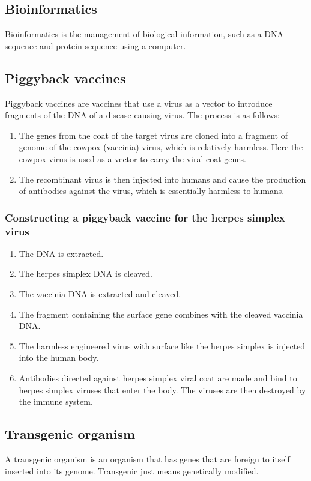 \documentclass[11pt]{article}
\begin{document}
\subsection{Bioinformatics}
\label{sec:orgea7b9d4}
Bioinformatics is the management of biological information, such as a DNA sequence and protein sequence using a computer.
\subsection{Piggyback vaccines}
\label{sec:orga0442e5}
Piggyback vaccines are vaccines that use a virus as a vector to introduce fragments of the DNA of a disease-causing virus. The process is as follows:
\begin{enumerate}
\item The genes from the coat of the target virus are cloned into a fragment of genome of the cowpox (vaccinia) virus, which is relatively harmless. Here the cowpox virus is used as a vector to carry the viral coat genes.
\item The recombinant virus is then injected into humans and cause the production of antibodies against the virus, which is essentially harmless to humans.
\end{enumerate}
\subsubsection{Constructing a piggyback vaccine for the herpes simplex virus}
\label{sec:org07b3dd5}
\begin{enumerate}
\item The DNA is extracted.
\item The herpes simplex DNA is cleaved.
\item The vaccinia DNA is extracted and cleaved.
\item The fragment containing the surface gene combines with the cleaved vaccinia DNA.
\item The harmless engineered virus with surface like the herpes simplex is injected into the human body.
\item Antibodies directed against herpes simplex viral coat are made and bind to herpes simplex viruses that enter the body. The viruses are then destroyed by the immune system.
\end{enumerate}
\subsection{Transgenic organism}
\label{sec:org6f81b75}
A transgenic organism is an organism that has genes that are foreign to itself inserted into its genome. Transgenic just means genetically modified.
\end{document}
